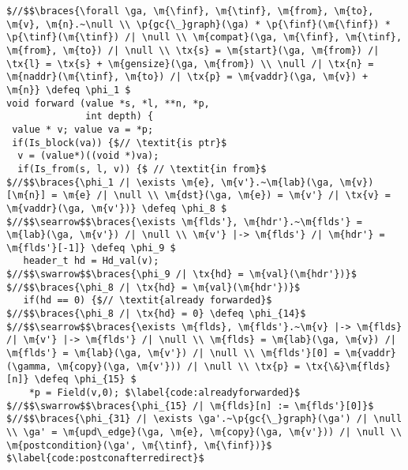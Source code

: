 \newcommand{\finf}{finf}
\newcommand{\tinf}{tinf}
\newcommand{\out}{out}
\newcommand{\braces}[1]{\left\{\!\!\!\begin{array}{l@{}} #1 \end{array}\right\}}
\newcommand{\ga}{\gamma}
\newcommand{\Eg}{E_\ga}
\newcommand{\Vg}{V_\ga}

\begin{figure*}[!ht]
\vspace{-1ex}
  \begin{lstlisting}[multicols=2]
$//$$\braces{\forall \ga, \m{\finf}, \m{\tinf}, \m{from}, \m{to}, \m{v}, \m{n}.~\null \\ \p{gc{\_}graph}(\ga) * \p{\finf}(\m{\finf}) * \p{\tinf}(\m{\tinf}) /| \null \\ \m{compat}(\ga, \m{\finf}, \m{\tinf}, \m{from}, \m{to}) /| \null \\ \tx{s} = \m{start}(\ga, \m{from}) /| \tx{l} = \tx{s} + \m{gensize}(\ga, \m{from}) \\ \null /| \tx{n} = \m{naddr}(\m{\tinf}, \m{to}) /| \tx{p} = \m{vaddr}(\ga, \m{v}) + \m{n}} \defeq \phi_1 $
void forward (value *s, *l, **n, *p, 
              int depth) {
 value * v; value va = *p; 
 if(Is_block(va)) {$// \textit{is ptr}$
  v = (value*)((void *)va); 
  if(Is_from(s, l, v)) {$ // \textit{in from}$
$//$$\braces{\phi_1 /| \exists \m{e}, \m{v'}.~\m{lab}(\ga, \m{v})[\m{n}] = \m{e} /| \null \\ \m{dst}(\ga, \m{e}) = \m{v'} /| \tx{v} = \m{vaddr}(\ga, \m{v'})} \defeq \phi_8 $
$//$$\searrow$$\braces{\exists \m{flds'}, \m{hdr'}.~\m{flds'} = \m{lab}(\ga, \m{v'}) /| \null \\ \m{v'} |-> \m{flds'} /| \m{hdr'} = \m{flds'}[-1]} \defeq \phi_9 $
   header_t hd = Hd_val(v);
$//$$\swarrow$$\braces{\phi_9 /| \tx{hd} = \m{val}(\m{hdr'})}$
$//$$\braces{\phi_8 /| \tx{hd} = \m{val}(\m{hdr'})}$ 
   if(hd == 0) {$// \textit{already forwarded}$
$//$$\braces{\phi_8 /| \tx{hd} = 0} \defeq \phi_{14}$ 
$//$$\searrow$$\braces{\exists \m{flds}, \m{flds'}.~\m{v} |-> \m{flds} /| \m{v'} |-> \m{flds'} /| \null \\ \m{flds} = \m{lab}(\ga, \m{v}) /| \m{flds'} = \m{lab}(\ga, \m{v'}) /| \null \\ \m{flds'}[0] = \m{vaddr}(\gamma, \m{copy}(\ga, \m{v'})) /| \null \\ \tx{p} = \tx{\&}\m{flds}[n]} \defeq \phi_{15} $
    *p = Field(v,0); $\label{code:alreadyforwarded}$
$//$$\swarrow$$\braces{\phi_{15} /| \m{flds}[n] := \m{flds'}[0]}$
$//$$\braces{\phi_{31} /| \exists \ga'.~\p{gc{\_}graph}(\ga') /| \null \\ \ga' = \m{upd\_edge}(\ga, \m{e}, \m{copy}(\ga, \m{v'})) /| \null \\ \m{postcondition}(\ga', \m{\tinf}, \m{\finf})}$ $\label{code:postconafterredirect}$

\end{lstlisting}
\end{figure*}
